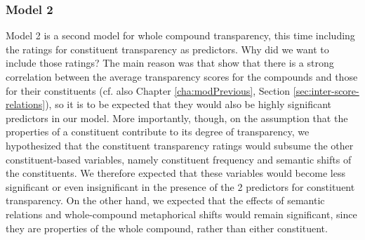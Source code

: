 



\subsubsection{Model 2}
Model 2 is a second model for whole compound transparency, this time
including the ratings for constituent transparency as predictors. Why
did we want to include those ratings? The main reason was that
\citet[213--214]{Reddyetal:2011} show that there is a strong
correlation between the average transparency scores for the compounds
and those for their constituents (cf. also Chapter
\ref{cha:modPrevious}, Section \ref{sec:inter-score-relations}), so it
is to be expected that they would also be highly significant
predictors in our model. More importantly, though, on the assumption
that the properties of a constituent contribute to its degree of
transparency, we hypothesized that the constituent transparency
ratings would subsume the other constituent-based variables, namely
constituent frequency and semantic shifts of the constituents. We
therefore expected that these variables would become less significant
or even insignificant in the presence of the 2 predictors for
constituent transparency. \enlargethispage{1\baselineskip}
On the other hand, we expected that the
effects of semantic relations and whole-compound metaphorical shifts
would remain significant, since they are properties of the whole
compound, rather than either constituent.


